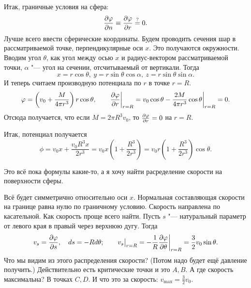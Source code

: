 Итак, граничные условия на сфера:
\[
  \frac{\partial \varphi}{\partial n}  \equiv\frac{\partial \varphi}{\partial r}\overset?=0.
\]
Лучше всего ввести сферические координаты.
Будем проводить сечения шар в рассматриваемой точке, перпендикулярные оси $x$. Это получаются окружности. Вводим угол $\theta$, как угол между осью $x$ и радиус-вектором рассматриваемой точки, $\alpha$ "--- угол на сечении, отсчитываемый от вертикали. Тогда
\[
 x = r\cos\theta,\ y = r\sin\theta\cos\alpha,\ z = r\sin \theta\sin\alpha.
\]
И теперь считаем производную потенциала по $r$ в точке $r=R$.
\[
  \varphi  = \left(v_0 + \frac M{4\pi r^3}\right)r\cos\theta,\qquad
  \frac{\partial \varphi}{\partial r}\bigg|_{r=R} = v_0\cos\theta - \frac{2M}{4\pi r^3}\cos\theta\bigg|_{r=R} = 0.
\]
Отсюда получается, что если $M = 2\pi R^3 v_0$, то $\frac{\partial \varphi}{\partial r} = 0$ на $r = R$.

Итак, потенциал получается
\[
  \phi = v_0x + \frac{v_0 R^3 x}{2r^3} = v_0 x\left(1+\frac{R^3}{2r^3}\right) = v_0 r\left(1+\frac{R^3}{2r^3}\right)\cos\theta.
\]

Это всё пока формулы какие-то, а я хочу найти расределение скорости на поверхности сферы.

Всё будет симметрично относительно оси $x$. Нормальная составляющая скорости на границе равна нулю по граничному условию. Скорость направлена по касательной. Как скорость проще всего найти. Пусть $s$ "--- натуральный параметр от левого края в правый через верхнюю дугу. Тогда
\[
  v_s = \frac{\partial \varphi}{\partial s},\quad ds = - R d\theta;\qquad v_s\big|_{r=R} = -\frac1R\frac{\partial \varphi}{\partial \theta}\bigg|_{r=R} = \frac32v_0\sin\theta.
\]
Что мы видим из этого распределения скорости? (Потом надо будет ещё давление получить.) Действительно есть критические точки и это $A,B$. А где скорость максимальна? В точках $C,D$. И что это за скорость: $v_{\max} = \frac32 v_0$.

